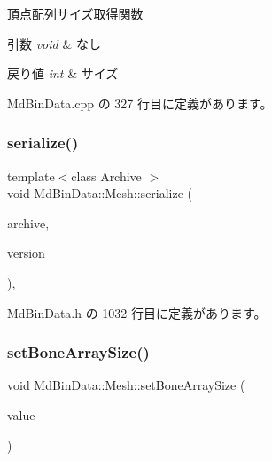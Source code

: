 頂点配列サイズ取得関数 


\begin{DoxyParams}{引数}
{\em void} & なし \\
\hline
\end{DoxyParams}

\begin{DoxyRetVals}{戻り値}
{\em int} & サイズ \\
\hline
\end{DoxyRetVals}


 Md\+Bin\+Data.\+cpp の 327 行目に定義があります。

\mbox{\label{class_md_bin_data_1_1_mesh_ae3ea8741ba987736f141d4b20470293d}} 
\subsubsection{\texorpdfstring{serialize()}{serialize()}}
{\footnotesize\ttfamily template$<$class Archive $>$ \\
void Md\+Bin\+Data\+::\+Mesh\+::serialize (\begin{DoxyParamCaption}\item[{Archive \&}]{archive,  }\item[{const unsigned}]{version }\end{DoxyParamCaption})\hspace{0.3cm}{\ttfamily [inline]}, {\ttfamily [private]}}



 Md\+Bin\+Data.\+h の 1032 行目に定義があります。

\mbox{\label{class_md_bin_data_1_1_mesh_a8b8125b4e6e716421edbe6e712b5615a}} 
\subsubsection{\texorpdfstring{set\+Bone\+Array\+Size()}{setBoneArraySize()}}
{\footnotesize\ttfamily void Md\+Bin\+Data\+::\+Mesh\+::set\+Bone\+Array\+Size (\begin{DoxyParamCaption}\item[{int}]{value }\end{DoxyParamCaption})}



